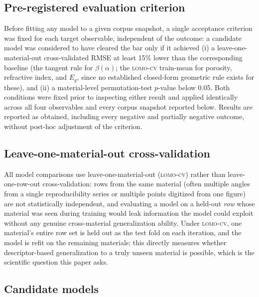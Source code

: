 \documentclass[aip,amsmath,amssymb,reprint]{revtex4-1}
\newcommand{\lomo}{\textsc{lomo-cv}}
\begin{document}
\subsection{Pre-registered evaluation criterion}
\label{ssec:preregistration}

Before fitting any model to a given corpus snapshot, a single
acceptance criterion was fixed for each target observable,
independent of the outcome: a candidate model was considered to have
cleared the bar only if it achieved (i) a leave-one-material-out
cross-validated RMSE at least 15\% lower than the corresponding
baseline (the tangent rule for $\beta(\alpha)$; the \lomo{} train-mean
for porosity, refractive index, and $E_g$, since no established
closed-form geometric rule exists for these), and (ii) a
material-level permutation-test $p$-value below 0.05. Both conditions
were fixed prior to inspecting either result and applied identically
across all four observables and every corpus snapshot reported below.
Results are reported as obtained, including every negative and
partially negative outcome, without post-hoc adjustment of the
criterion.

\subsection{Leave-one-material-out cross-validation}
\label{ssec:lomo}

All model comparisons use leave-one-material-out (\lomo{}) rather than
leave-one-row-out cross-validation: rows from the same material
(often multiple angles from a single reproducibility series or
multiple points digitized from one figure) are not statistically
independent, and evaluating a model on a held-out \emph{row} whose
material was seen during training would leak information the model
could exploit without any genuine cross-material generalization
ability. Under \lomo{}, one material's entire row set is held out as
the test fold on each iteration, and the model is refit on the
remaining materials; this directly measures whether descriptor-based
generalization to a truly unseen material is possible, which is the
scientific question this paper asks.

\subsection{Candidate models}
\label{ssec:models}
\end{document}

